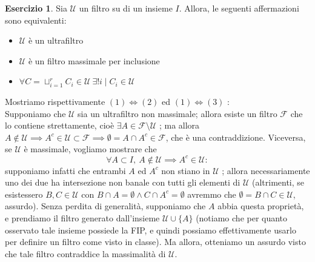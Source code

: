 \documentclass[a4paper]{article}
\theoremstyle{definition}
\theoremstyle{definition}
\theoremstyle{remark}
\theoremstyle{definition}
\newtheorem*{exercise*}{Esercizio}
\begin{document}
\begin{exercise*}
	Sia $\mathcal{U}$ un filtro su di un insieme $I$. Allora, le seguenti affermazioni sono equivalenti:
	\begin{itemize}
		\item $\mathcal{U}$ è un ultrafiltro
		\item $\mathcal{U}$ è un filtro massimale per inclusione
		\item $\forall C=\sqcup_{i=1}^r{C_i}\in\mathcal{U}~\exists! i\mid C_i\in\mathcal{U}$
	\end{itemize}
\end{exercise*}
Mostriamo rispettivamente $(1)\iff(2)$ ed $(1)\iff(3)$ :\\
\noindent
Supponiamo che $\mathcal{U}$ sia un ultrafiltro non massimale; allora esiste un filtro $\mathcal{F}$ che lo contiene strettamente, cioè $\exists
A\in\mathcal{F}\setminus\mathcal{U}$ ; ma allora $A\not\in\mathcal{U}\implies A^c\in\mathcal{U}\subset\mathcal{F}\implies \emptyset=A\cap A^c\in\mathcal{F}$, che è una
contraddizione.
Viceversa, se $\mathcal{U}$ è massimale, vogliamo mostrare che $$\forall A\subset I,~A\not\in\mathcal{U}\implies A^c\in\mathcal{U}:$$ supponiamo infatti che entrambi $A$ ed $A^c$
non stiano in $\mathcal{U}$ ; allora necessariamente uno dei due ha intersezione non banale con tutti gli elementi di $\mathcal{U}$ (altrimenti, se esistessero $B,
C\in\mathcal{U}$ con $B\cap A=\emptyset \land C\cap A^c=\emptyset$ avremmo che $\emptyset=B\cap C\in\mathcal{U}$, assurdo). Senza perdita di generalità, supponiamo che $A$ abbia
questa proprietà, e prendiamo il filtro generato dall'insieme $\mathcal{U}\cup \{A\}$ (notiamo che per quanto osservato tale insieme possiede la FIP, e quindi possiamo
effettivamente usarlo per definire un filtro come visto in classe). Ma allora, otteniamo un assurdo visto che tale filtro contraddice la massimalità di $\mathcal{U}$.\\
\end{document}
